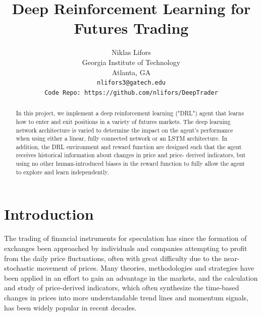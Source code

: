\documentclass[10pt,twocolumn,letterpaper]{article}
\begin{document}
\title{Deep Reinforcement Learning for Futures Trading}

\author{Niklas Lifors\\
Georgia Institute of Technology\\
Atlanta, GA\\
{\tt\small nlifors3@gatech.edu}\\
{\tt\small Code Repo: https://github.com/nlifors/DeepTrader}
}

\maketitle

\begin{abstract}
   In this project, we implement a deep reinforcement learning 
   ("DRL") agent that learns how to enter and exit positions in a variety 
   of futures markets. The deep learning network architecture is varied to
   determine the impact on the agent's performance when using either a 
   linear, fully connected network or an LSTM architecture. In addition,
   the DRL environment and reward function are designed such that the
   agent receives historical information about changes in price and price-
   derived indicators, but using no other human-introduced biases in the
   reward function to fully allow the agent to explore and learn independently.
\end{abstract}

\section{Introduction}
The trading of financial instruments for speculation has since the formation of exchanges been approached by individuals and companies attempting to profit from the daily price fluctuations, often with great difficulty due to the near-stochastic movement of prices. Many theories, methodologies and strategies have been applied in an effort to gain an advantage in the markets, and the calculation and study of price-derived indicators, which often synthesize the time-based changes in prices into more understandable trend lines and momentum signals, has been widely popular in recent decades.
\end{document}
